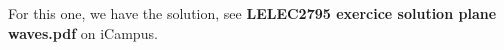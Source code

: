 For this one, we have the solution, see {\bf LELEC2795 exercice solution plane waves.pdf} on iCampus.